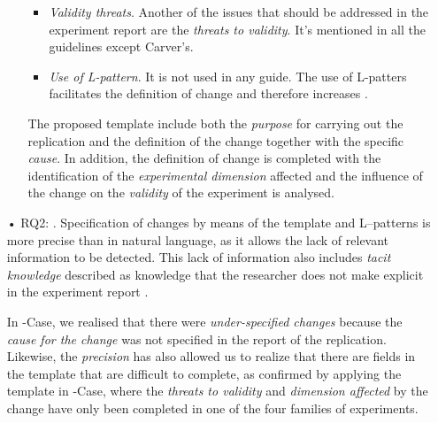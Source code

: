 \begin{itemize}
\begin{enumerate}
\begin{itemize}
	    \item \emph{Validity threats}. Another of the issues that should be addressed in the experiment report are the \emph{threats to validity}. It's mentioned in all the guidelines except Carver's.
	    
	    \item \emph{Use of L-pattern}. It is not used in any guide. The use of L-patters facilitates the definition of change and therefore increases \emph{\expressiveness}.

    \end{itemize}

    The proposed template include both the \emph{purpose} for carrying out the replication and the definition of the change together with the specific \emph{cause}.
    In addition, the definition of change is completed with the identification of the \emph{experimental dimension} affected and the influence of the change on the \emph{validity} of the experiment is analysed.
    
    
    \end{enumerate}

    \item[•] RQ2: \emph{\Precision}. Specification of changes by means of the template and L--patterns is more precise than in natural language, as it allows the lack of relevant information to be detected.
    This lack of information also includes \emph{tacit knowledge} described as knowledge that the researcher does not make explicit in the experiment report \cite{shull2002replicating}.
    
    In \SoftEng-Case, we realised that there were \emph{under-specified changes} because the \emph{cause for the change} was not specified in the report of the replication.
    Likewise, the \emph{precision} has also allowed us to realize that there are fields in the template that are difficult to complete, as confirmed by applying the template in \Science-Case, where the \emph{threats to validity} and \emph{dimension affected} by the change have only been completed in one of the four families of experiments. \\ %
    

\end{itemize}
